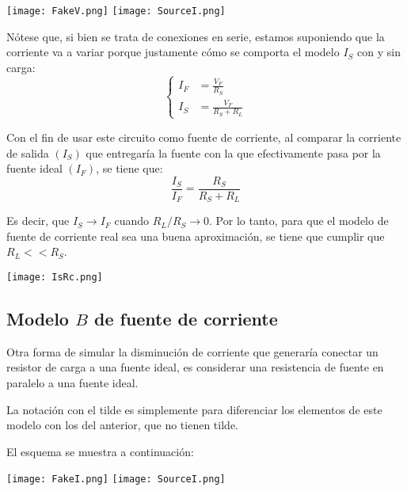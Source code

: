 \documentclass[a5paper,12pt,twoside]{book}
\begin{document}
\begin{center}
    \texttt{[image: FakeV.png]}
    \texttt{[image: SourceI.png]}
\end{center}

Nótese que, si bien se trata de conexiones en serie, estamos suponiendo que la corriente va a variar porque justamente cómo se comporta el modelo $I_S$ con y sin carga:
\begin{equation*}
    \left\{
    \begin{aligned}
        I_F &= \frac{V_F}{R_S}
        \\[1ex]
        I_S &= \frac{V_F}{R_S + R_L}
    \end{aligned}
    \right.
\end{equation*}

Con el fin de usar este circuito como fuente de corriente, al comparar la corriente de salida $(I_S)$ que entregaría la fuente con la que efectivamente pasa por la fuente ideal $(I_F)$, se tiene que:
\begin{equation*}
    \frac{I_S}{I_F} = \frac{R_S}{R_S + R_L}
\end{equation*}

Es decir, que $I_S \to I_F$ cuando $R_L/R_S \to 0$. Por lo tanto, para que el modelo de fuente de corriente real sea una buena aproximación, se tiene que cumplir que $R_L<<R_S$.

\begin{center}
    \texttt{[image: IsRc.png]}
\end{center}


\subsection*{Modelo $B$ de fuente de corriente}

Otra forma de simular la disminución de corriente que generaría conectar un resistor de carga a una fuente ideal, es considerar una resistencia de fuente en paralelo a una fuente ideal.

La notación con el tilde es simplemente para diferenciar los elementos de este modelo con los del anterior, que no tienen tilde.

El esquema se muestra a continuación:

\begin{center}
    \texttt{[image: FakeI.png]}
    \texttt{[image: SourceI.png]}
\end{center}
\end{document}

